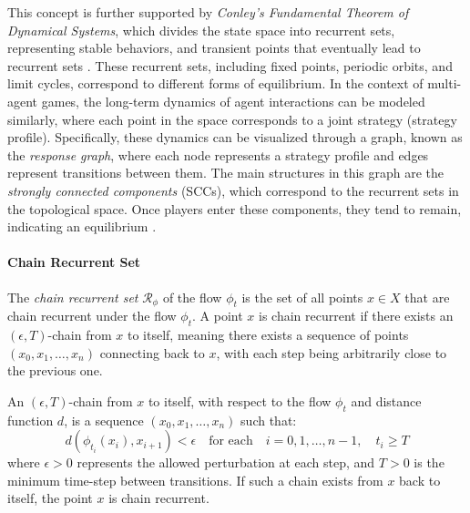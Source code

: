         \noindent
        This concept is further supported by \emph{Conley's Fundamental Theorem of Dynamical Systems}, which divides the state space into recurrent sets, representing stable behaviors, and transient points that eventually lead to recurrent sets \cite{conley1978isolated}\cite{Norton1995}. These recurrent sets, including fixed points, periodic orbits, and limit cycles, correspond to different forms of equilibrium. In the context of multi-agent games, the long-term dynamics of agent interactions can be modeled similarly, where each point in the space corresponds to a joint strategy (strategy profile). Specifically, these dynamics can be visualized through a graph, known as the \emph{response graph}, where each node represents a strategy profile and edges represent transitions between them. The main structures in this graph are the \emph{strongly connected components} (SCCs), which correspond to the recurrent sets in the topological space. Once players enter these components, they tend to remain, indicating an equilibrium \cite{omidshafiei2019alpharank}.
        
        \paragraph{Chain Recurrent Set}

            The \emph{chain recurrent set} $\mathcal{R}_\phi$ of the flow $\phi_t$ is the set of all points $x \in X$ that are chain recurrent under the flow $\phi_t$. A point $x$ is chain recurrent if there exists an $(\epsilon, T)$-chain from $x$ to itself, meaning there exists a sequence of points $(x_0, x_1, \dots, x_n)$ connecting back to $x$, with each step being arbitrarily close to the previous one.

            \begin{definition}
                An $(\epsilon, T)$-chain from $x$ to itself, with respect to the flow $\phi_t$ and distance function $d$, is a sequence $(x_0, x_1, \dots, x_n)$ such that:
                \begin{equation}
                    d(\phi_{t_i}(x_i), x_{i+1}) < \epsilon \quad \text{for each} \quad i = 0, 1, \dots, n-1, \quad t_i \geq T
                    \nonumber
                \end{equation}
                where $\epsilon > 0$ represents the allowed perturbation at each step, and $T > 0$ is the minimum time-step between transitions. If such a chain exists from $x$ back to itself, the point $x$ is chain recurrent.
            \end{definition}

